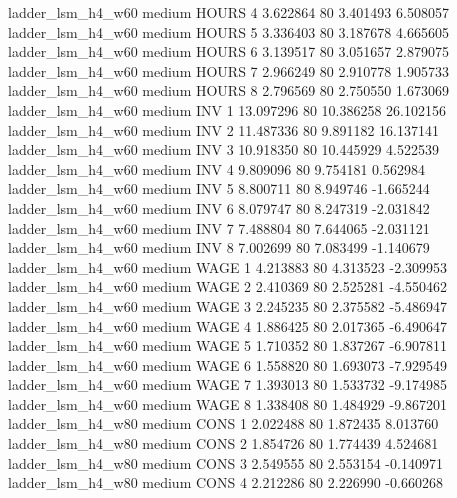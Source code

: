   ladder_lsm_h4_w60     medium    HOURS                 4  3.622864 80       3.401493           6.508057
  ladder_lsm_h4_w60     medium    HOURS                 5  3.336403 80       3.187678           4.665605
  ladder_lsm_h4_w60     medium    HOURS                 6  3.139517 80       3.051657           2.879075
  ladder_lsm_h4_w60     medium    HOURS                 7  2.966249 80       2.910778           1.905733
  ladder_lsm_h4_w60     medium    HOURS                 8  2.796569 80       2.750550           1.673069
  ladder_lsm_h4_w60     medium      INV                 1 13.097296 80      10.386258          26.102156
  ladder_lsm_h4_w60     medium      INV                 2 11.487336 80       9.891182          16.137141
  ladder_lsm_h4_w60     medium      INV                 3 10.918350 80      10.445929           4.522539
  ladder_lsm_h4_w60     medium      INV                 4  9.809096 80       9.754181           0.562984
  ladder_lsm_h4_w60     medium      INV                 5  8.800711 80       8.949746          -1.665244
  ladder_lsm_h4_w60     medium      INV                 6  8.079747 80       8.247319          -2.031842
  ladder_lsm_h4_w60     medium      INV                 7  7.488804 80       7.644065          -2.031121
  ladder_lsm_h4_w60     medium      INV                 8  7.002699 80       7.083499          -1.140679
  ladder_lsm_h4_w60     medium     WAGE                 1  4.213883 80       4.313523          -2.309953
  ladder_lsm_h4_w60     medium     WAGE                 2  2.410369 80       2.525281          -4.550462
  ladder_lsm_h4_w60     medium     WAGE                 3  2.245235 80       2.375582          -5.486947
  ladder_lsm_h4_w60     medium     WAGE                 4  1.886425 80       2.017365          -6.490647
  ladder_lsm_h4_w60     medium     WAGE                 5  1.710352 80       1.837267          -6.907811
  ladder_lsm_h4_w60     medium     WAGE                 6  1.558820 80       1.693073          -7.929549
  ladder_lsm_h4_w60     medium     WAGE                 7  1.393013 80       1.533732          -9.174985
  ladder_lsm_h4_w60     medium     WAGE                 8  1.338408 80       1.484929          -9.867201
  ladder_lsm_h4_w80     medium     CONS                 1  2.022488 80       1.872435           8.013760
  ladder_lsm_h4_w80     medium     CONS                 2  1.854726 80       1.774439           4.524681
  ladder_lsm_h4_w80     medium     CONS                 3  2.549555 80       2.553154          -0.140971
  ladder_lsm_h4_w80     medium     CONS                 4  2.212286 80       2.226990          -0.660268
